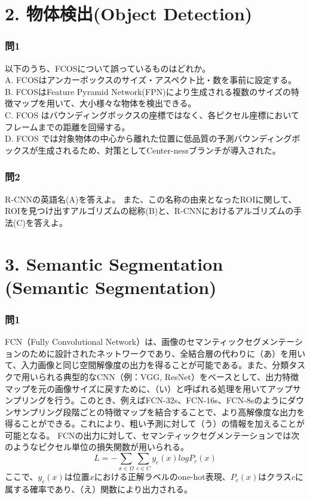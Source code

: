 \documentclass[
  letterpaper,
  DIV=11,
  numbers=noendperiod]{scrreprt}
\begin{document}
\chapter{2. 物体検出(Object
Detection)}\label{ux7269ux4f53ux691cux51faobject-detection}

\subsection{問1}\label{ux554f1-3}

以下のうち、FCOSについて誤っているものはどれか。\\
A. FCOSはアンカーボックスのサイズ・アスペクト比・数を事前に設定する。\\
B. FCOSはFeature Pyramid
Network(FPN)により生成される複数のサイズの特徴マップを用いて、大小様々な物体を検出できる。\\
C. FCOS
はバウンディングボックスの座標ではなく、各ピクセル座標においてフレームまでの距離を回帰する。\\
D. FCOS
では対象物体の中心から離れた位置に低品質の予測バウンディングボックスが生成されるため、対策としてCenter-nessブランチが導入された。

\subsection{問2}\label{ux554f2-2}

R-CNNの英語名(A)を答えよ。
また、この名称の由来となったROIに関して、ROIを見つけ出すアルゴリズムの総称(B)と、R-CNNにおけるアルゴリズムの手法(C)を答えよ。

\chapter{3. Semantic Segmentation (Semantic
Segmentation)}\label{semantic-segmentation-semantic-segmentation}

\subsection{問1}\label{ux554f1-4}

FCN（Fully Convolutional
Network）は、画像のセマンティックセグメンテーションのために設計されたネットワークであり、全結合層の代わりに（あ）を用いて、入力画像と同じ空間解像度の出力を得ることが可能である。また、分類タスクで用いられる典型的なCNN（例：VGG,
ResNet）をベースとして、出力特徴マップを元の画像サイズに戻すために、（い）と呼ばれる処理を用いてアップサンプリングを行う。このとき、例えばFCN-32s、FCN-16s、FCN-8sのようにダウンサンプリング段階ごとの特徴マップを結合することで、より高解像度な出力を得ることができる。これにより、粗い予測に対して（う）の情報を加えることが可能となる。
FCNの出力に対して、セマンティックセグメンテーションでは次のようなピクセル単位の損失関数が用いられる。
\[
𝐿=−∑_{𝑥∈Ω}∑_{c∈C}y_c(x)logP_c(x)
\]
ここで、\(y_c(x)\)は位置\(x\)における正解ラベルのone-hot表現、\(P_c(x)\)はクラス\(c\)に属する確率であり、（え）関数により出力される。
\end{document}
